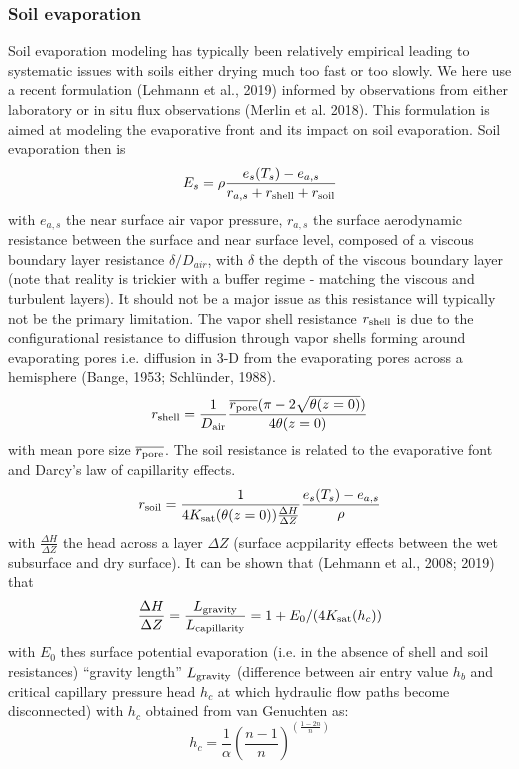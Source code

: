 \documentclass[twoside,10pt]{report}
\begin{document}
\subsubsection{Soil evaporation}
Soil evaporation modeling has typically been relatively empirical leading to systematic issues with soils either drying much too fast or too slowly. We here use a recent formulation (Lehmann et al., 2019) informed by observations from either laboratory or in situ flux observations (Merlin et al. 2018). This formulation is aimed at modeling the evaporative front and its impact on soil evaporation. 
Soil evaporation then is 
\begin{equation}
    E_s = \rho \frac{e_s(T_s)-e_{a,s}}{r_{a,s}+r_{\rm shell}+r_{\rm soil}}
\end{equation}
with $e_{a,s}$ the near surface air vapor pressure, $r_{a,s}$ the surface aerodynamic resistance between the surface and near surface level, composed of a viscous boundary layer resistance $\delta /D_{air}$, with $\delta$ the depth of the viscous boundary layer (note that reality is trickier with a buffer regime - matching the viscous and turbulent layers). It should not be a major issue as this resistance will typically not be the primary limitation. The vapor shell resistance $r_{\rm shell}$ is due to the configurational resistance to diffusion through vapor shells forming around evaporating pores i.e. diffusion in 3-D from the evaporating pores across a hemisphere (Bange, 1953; Schlünder, 1988).
\begin{equation}
    r_{\rm shell} = \frac{1}{D_{\rm air}}\frac{\overline{r_{\rm pore}}(\pi-2\sqrt{\theta(z=0)})}{4\theta(z=0)}
\end{equation}
with mean pore size $\overline{r_{\rm pore}}$.
The soil resistance is related to the evaporative font and Darcy's law of capillarity effects.
\begin{equation}
    r_{\rm soil} = \frac{1}{4 K_{\mathrm{sat}}(\theta(z=0))\frac{\Delta H}{\Delta Z}}\frac{e_s(T_s)-e_{a,s}}{\rho}
\end{equation}
with $\frac{\Delta H}{\Delta Z}$ the head across a layer $\Delta Z$ (surface acppilarity effects between the wet subsurface and dry surface). It can be shown that (Lehmann et al., 2008; 2019) that 
\begin{equation}
   \frac{\Delta H}{\Delta Z} = \frac{L_{\rm gravity}}{L_{\rm capillarity}} = 1+E_0/(4K_{\mathrm{sat}}(h_c))
\end{equation}
with $E_0$ thes surface potential evaporation (i.e. in the absence of shell and soil resistances) “gravity length” $L_{\rm gravity}$ (difference between air entry value $h_b$ and critical capillary pressure head $h_c$ at which hydraulic flow paths become disconnected) with $h_c$ obtained from van Genuchten as:
\begin{equation}
   h_c = \frac{1}{\alpha}\left( \frac{n-1}{n} \right)^{\left( \frac{1-2n}{n} \right)}
\end{equation}
\end{document}
